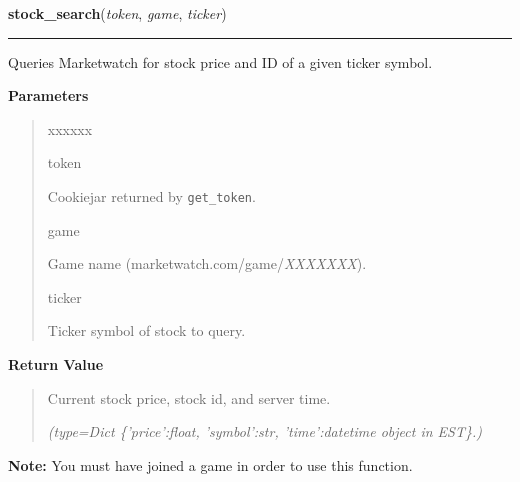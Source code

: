     \label{moira:stock_search}

    \vspace{0.5ex}

\hspace{.8\funcindent}\begin{boxedminipage}{\funcwidth}

    \raggedright \textbf{stock\_search}(\textit{token}, \textit{game}, \textit{ticker})

    \vspace{-1.5ex}

    \rule{\textwidth}{0.5\fboxrule}
\setlength{\parskip}{2ex}
    Queries Marketwatch for stock price and ID of a given ticker symbol.

\setlength{\parskip}{1ex}
      \textbf{Parameters}
      \vspace{-1ex}

      \begin{quote}
        \begin{Ventry}{xxxxxx}

          \item[token]

          Cookiejar returned by \texttt{get\_token}.

          \item[game]

          Game name (marketwatch.com/game/\textit{XXXXXXX}).

          \item[ticker]

          Ticker symbol of stock to query.

        \end{Ventry}

      \end{quote}

      \textbf{Return Value}
    \vspace{-1ex}

      \begin{quote}
      Current stock price, stock id, and server time.

      {\it (type=Dict \{'price':float, 'symbol':str, 'time':\textit{datetime} object 
      in EST\}.)}

      \end{quote}

\textbf{Note:} You must have joined a game in order to use this function.



    \end{boxedminipage}


